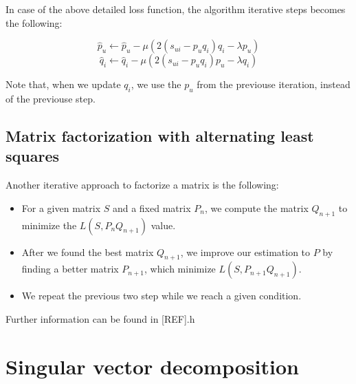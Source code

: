 In case of the above detailed loss function, the algorithm iterative steps becomes the following:

\[ \hat{p}_{u}\leftarrow \hat{p}_{u}-\mu (2(s_{ui}-p_u q_i)q_i - \lambda p_u)\]
\[\hat{q}_{i}\leftarrow \hat{q}_{i}-\mu (2(s_{ui}-p_u q_i)p_u - \lambda q_i) \]

Note that, when we update $q_i$, we use the $p_u$ from the previouse iteration, instead of
the previouse step.


\subsection{Matrix factorization with alternating least squares}
Another iterative approach to factorize a matrix is the following:
\begin{itemize}
\item For a given matrix $S$ and a fixed matrix $P_n$, we compute the matrix $Q_{n+1}$ to 
minimize the $L(S,P_n Q_{n+1})$ value.
\item  After we found the best matrix $Q_{n+1}$, we improve our estimation to
$P$ by finding a better matrix $P_{n+1}$, which minimize  $L(S,P_{n+1} Q_{n+1})$.
\item We repeat the previous two step while we reach a given condition. 
\end{itemize}

Further information can be found in [REF].h
\section{Singular vector decomposition}

